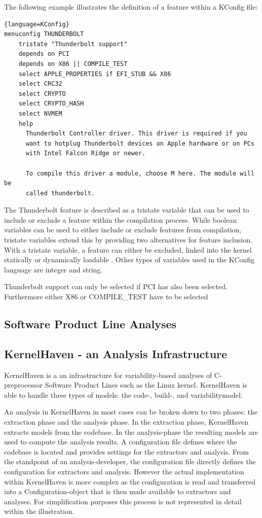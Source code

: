 \documentclass[a4paper]{article}
\begin{document}
The following example illustrates the definition of a feature within a KConfig file:

\begin{lstlisting}{language=KConfig}
menuconfig THUNDERBOLT
	tristate "Thunderbolt support"
	depends on PCI
	depends on X86 || COMPILE_TEST
	select APPLE_PROPERTIES if EFI_STUB && X86
	select CRC32
	select CRYPTO
	select CRYPTO_HASH
	select NVMEM
	help
	  Thunderbolt Controller driver. This driver is required if you
	  want to hotplug Thunderbolt devices on Apple hardware or on PCs
	  with Intel Falcon Ridge or newer.

	  To compile this driver a module, choose M here. The module will be
	  called thunderbolt.
 \end{lstlisting}
 
The Thunderbolt feature is described as a tristate variable that can be used to include or exclude a feature within the compilation process. While boolean variables can be used to either include or exclude features from compilation, tristate variables extend this by providing two alternatives for feature inclusion. With a tristate variable, a feature can either be excluded, linked into the kernel statically or dynamically loadable \cite{variabilitymodel-linux}. Other types of variables used in the KConfig language are integer and string.

Thunderbolt support can only be selected if PCI has also been selected. Furthermore either X86 or COMPILE\_TEST have to be selected
 


\newpage


\subsection{Software Product Line Analyses}

\subsection{KernelHaven - an Analysis Infrastructure}\label{kernelhaven}

KernelHaven is a an infrastructure for variability-based analyses of C-preprocessor Software Product Lines \cite{KroeherEl-SharkawySchmid18} such as the Linux kernel. KernelHaven is able to handle three types of models: the code-, build-, and variabilitymodel. 

 An analysis in KernelHaven in most cases can be broken down to two phases: the extraction phase and the analysis phase. In the extraction phase, KernelHaven extracts models from the codebase. In the analysis-phase the resulting models are used to compute the analysis results. A configuration file defines where the codebase is located and provides settings for the extractors and analysis. From the standpoint of an analysis-developer, the configuration file directly defines the configuration for extractors and analysis. However the actual implementation within KernelHaven is more complex as the configuration is read and transferred into a Configuration-object that is then made available to extractors and analyses. For simplification purposes this process is not represented in detail within the illustration. 
\end{document}
